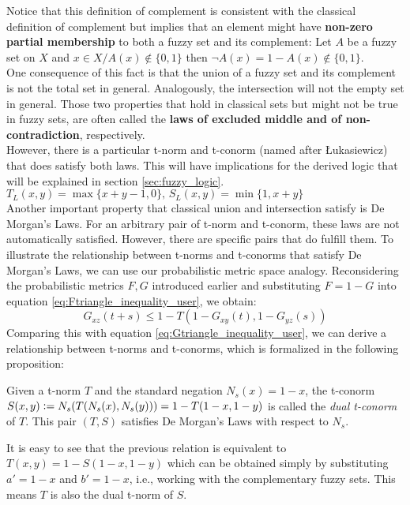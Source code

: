Notice that this definition of complement is consistent with the classical definition of complement but implies that an element might have \textbf{non-zero partial membership} to both a fuzzy set and its complement: Let $A$ be a fuzzy set on $X$ and $x \in X / A(x)\notin \{0,1\}$ then $\lnot A(x)= 1 - A(x) \notin \{0,1\}$.\\
One consequence of this fact is that the union of a fuzzy set and its complement is not the total set in general. Analogously, the intersection will not the empty set in general. Those two properties that hold in classical sets but might not be true in fuzzy sets, are often called the \textbf{laws of excluded middle and of non-contradiction}, respectively.\\
However, there is a particular t-norm and t-conorm (named after Łukasiewicz) that does satisfy both laws. This will have implications for the derived logic that will be explained in section \ref{sec:fuzzy_logic}. 
\hspace{10em}$T_L(x,y)=\max\{x+y-1,0\},\, S_L(x,y)=\min\{1,x+y\}$\\
Another important property that classical union and intersection satisfy is De Morgan's Laws. For an arbitrary pair of t-norm and t-conorm, these laws are not automatically satisfied. However, there are specific pairs that do fulfill them. To illustrate the relationship between t-norms and t-conorms that satisfy De Morgan's Laws, we can use our probabilistic metric space analogy. Reconsidering the probabilistic metrics $F,G$ introduced earlier and substituting $F = 1 - G$ into equation \ref{eq:Ftriangle_inequality_user}, we obtain:
\[ G_{xz}(t + s) \leq 1 - T(1 - G_{xy}(t), 1 - G_{yz}(s))\]
Comparing this with equation \ref{eq:Gtriangle_inequality_user}, we can derive a relationship between t-norms and t-conorms, which is formalized in the following proposition:
\begin{proposition}
  Given a t-norm $T$ and the standard negation $N_s(x)=1-x$, the t-conorm $S(x,y)\mathrel{\mathop:}= N_s(T(N_s(x), N_s(y))) = 1 - T(1-x, 1-y)$ is called the \emph{dual t-conorm} of $T$. This pair $(T,S)$ satisfies De Morgan's Laws with respect to $N_s$.
\end{proposition}
\begin{remark}
  It is easy to see that the previous relation is equivalent to $T(x,y) = 1-S(1-x, 1-y)$ which can be obtained simply by substituting $a'=1-x$ and $b'=1-x$, i.e., working with the complementary fuzzy sets. This means $T$ is also the dual t-norm of $S$.
\end{remark}
  
